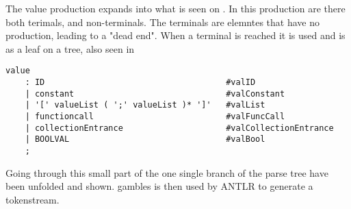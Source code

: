 The value production expands into what is seen on .
In this production are there both terimals, and non-terminals.
The terminals are elemntes that have no production, leading to a "dead end".
When a terminal is reached it is used and is as a leaf on a tree, also seen in 
\begin{lstlisting}[caption={\acrshort{cfg} Value},label={lst:value},numbers=none]
value
    : ID                                     #valID
    | constant                               #valConstant
    | '[' valueList ( ';' valueList )* ']'   #valList
    | functioncall                           #valFuncCall
    | collectionEntrance                     #valCollectionEntrance
    | BOOLVAL                                #valBool
    ;
\end{lstlisting}

Going through this small part of the  one single branch of the parse tree have been unfolded and shown.
\gls{gamble}s  is then used by ANTLR to generate a tokenstream. 